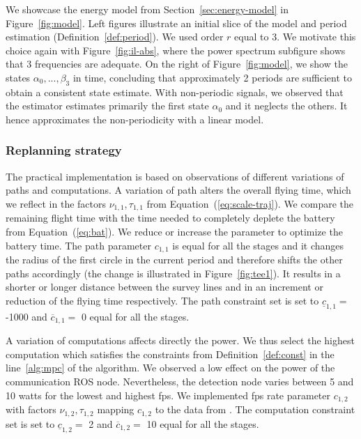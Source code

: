 We showcase the energy model from Section~\ref{sec:energy-model} in Figure~\ref{fig:model}. Left figures illustrate an initial slice of the model and period estimation (Definition~\ref{def:period}). We used order $r$ equal to 3. We motivate this choice again with Figure~\ref{fig:il-abs}, where the power spectrum subfigure shows that 3 frequencies are adequate. On the right of Figure~\ref{fig:model}, we show the states $\alpha_0,...,\beta_3$ in time, concluding that approximately 2 periods are sufficient to obtain a consistent state estimate. With non-periodic signals, we observed that the estimator estimates primarily the first state $\alpha_0$ and it neglects the others. It hence approximates the non-periodicity with a linear model.

\subsubsection*{Replanning strategy}

The practical implementation is based on observations of different variations of paths and computations. A variation of path alters the overall flying time, which we reflect in the factors $\nu_{1,1},\tau_{1,1}$ from Equation~(\ref{eq:scale-traj}). We compare the remaining flight time with the time needed to completely deplete the battery from Equation~(\ref{eq:bat}). We reduce or increase the parameter to optimize the battery time. The path parameter $c_{1,1}$ is equal for all the stages and it changes the radius of the first circle in the current period and therefore shifts the other paths accordingly (the change is illustrated in Figure~\ref{fig:tee1}). It results in a shorter or longer distance between the survey lines and in an increment or reduction of the flying time respectively. The path constraint set is set to $\underline{c}_{1,1}=$ -1000 and $\overline{c}_{1,1}=$ 0 equal for all the stages.

A variation of computations affects directly the power. We thus select the highest computation which satisfies the constraints from Definition~\ref{def:const} in the line~\ref{alg:mpc} of the algorithm. We observed a low effect on the power of the communication ROS node. Nevertheless, the detection node varies between 5 and 10 watts for the lowest and highest fps. We implemented fps rate parameter $c_{1,2}$ with factors  $\nu_{1,2},\tau_{1,2}$ mapping $c_{1,2}$ to the data from \powprof{}. The computation constraint set is set to $\underline{c}_{1,2}=$ 2 and $\overline{c}_{1,2}=$ 10 equal for all the stages.

